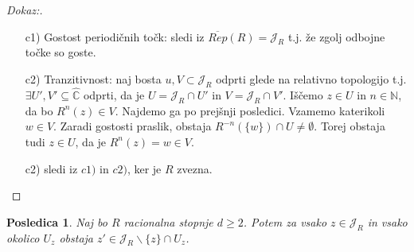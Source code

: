 \documentclass{article}
\newtheorem{posledica}{Posledica}
\newcommand{\C}{\mathbb{C}}
\newcommand{\N}{\mathbb{N}}
\begin{document}
\begin{proof}[Dokaz:]
\hfill
\begin{enumerate}
    \item[c1)] Gostost periodičnih točk: sledi iz $\overline{Rep}(R) = \mathcal{J}_R$
    t.j. že zgolj odbojne točke so goste.
    \item[c2)] Tranzitivnost: naj bosta $u, V \subset \mathcal{J}_R$ odprti 
    glede na relativno topologijo t.j. $\exists U', V' \subseteq \hat{\C}$
    odprti, da je $U = \mathcal{J}_R \cap U'$ in $V = \mathcal{J}_R \cap V'$. 
    Iščemo $z\in U$ in $n\in \N$, da bo $R^n(z) \in V$. Najdemo ga po prejšnji 
    posledici. Vzamemo katerikoli $w\in V$. Zaradi gostosti praslik, obstaja 
    $R^{-n}(\{w\}) \cap U \neq \emptyset$. Torej obstaja tudi $z\in U$, da je 
    $R^n(z) = w \in V$.
    \begin{center}
    \end{center}
    \item[c2)] sledi iz $c1)$ in $c2)$, ker je $R$ zvezna.
\end{enumerate}
\end{proof}

\begin{posledica}
Naj bo $R$ racionalna stopnje $d \geq 2$. Potem za vsako $z\in \mathcal{J}_R$
in vsako okolico $U_z$ obstaja $z'\in \mathcal{J}_R \backslash \{z\} \cap U_z$.
\end{posledica}
\end{document}
